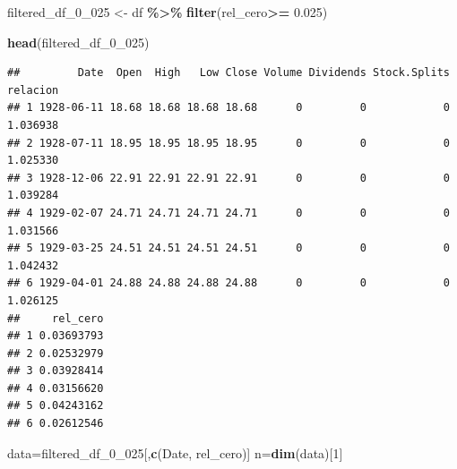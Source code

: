 \documentclass[
  oneside]{article}
\newenvironment{Shaded}{\begin{snugshade}}{\end{snugshade}}
\newcommand{\CommentTok}[1]{\textcolor[rgb]{0.56,0.35,0.01}{\textit{#1}}}
\newcommand{\DecValTok}[1]{\textcolor[rgb]{0.00,0.00,0.81}{#1}}
\newcommand{\FloatTok}[1]{\textcolor[rgb]{0.00,0.00,0.81}{#1}}
\newcommand{\FunctionTok}[1]{\textcolor[rgb]{0.13,0.29,0.53}{\textbf{#1}}}
\newcommand{\NormalTok}[1]{#1}
\newcommand{\OtherTok}[1]{\textcolor[rgb]{0.56,0.35,0.01}{#1}}
\newcommand{\SpecialCharTok}[1]{\textcolor[rgb]{0.81,0.36,0.00}{\textbf{#1}}}
\newcommand{\StringTok}[1]{\textcolor[rgb]{0.31,0.60,0.02}{#1}}
\begin{document}
\begin{Shaded}
\begin{Highlighting}[]
\NormalTok{filtered\_df\_0\_025 }\OtherTok{\textless{}{-}}\NormalTok{ df }\SpecialCharTok{\%\textgreater{}\%}
  \FunctionTok{filter}\NormalTok{(rel\_cero}\SpecialCharTok{\textgreater{}=} \FloatTok{0.025}\NormalTok{)}
\end{Highlighting}
\end{Shaded}

\begin{Shaded}
\begin{Highlighting}[]
\FunctionTok{head}\NormalTok{(filtered\_df\_0\_025)}
\end{Highlighting}
\end{Shaded}

\begin{verbatim}
##         Date  Open  High   Low Close Volume Dividends Stock.Splits relacion
## 1 1928-06-11 18.68 18.68 18.68 18.68      0         0            0 1.036938
## 2 1928-07-11 18.95 18.95 18.95 18.95      0         0            0 1.025330
## 3 1928-12-06 22.91 22.91 22.91 22.91      0         0            0 1.039284
## 4 1929-02-07 24.71 24.71 24.71 24.71      0         0            0 1.031566
## 5 1929-03-25 24.51 24.51 24.51 24.51      0         0            0 1.042432
## 6 1929-04-01 24.88 24.88 24.88 24.88      0         0            0 1.026125
##     rel_cero
## 1 0.03693793
## 2 0.02532979
## 3 0.03928414
## 4 0.03156620
## 5 0.04243162
## 6 0.02612546
\end{verbatim}

\begin{Shaded}
\begin{Highlighting}[]
\NormalTok{data}\OtherTok{=}\NormalTok{filtered\_df\_0\_025[,}\FunctionTok{c}\NormalTok{(}\StringTok{\textquotesingle{}Date\textquotesingle{}}\NormalTok{, }\StringTok{\textquotesingle{}rel\_cero\textquotesingle{}}\NormalTok{)]}
\NormalTok{n}\OtherTok{=}\FunctionTok{dim}\NormalTok{(data)[}\DecValTok{1}\NormalTok{]}
\end{Highlighting}
\end{Shaded}

\begin{Shaded}
\end{Shaded}
\end{document}
